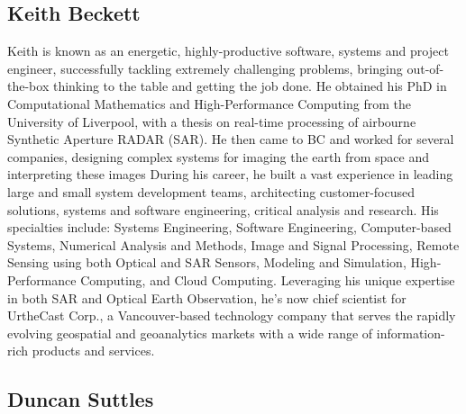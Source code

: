 \subsection*{Keith Beckett}

Keith is known as an energetic, highly-productive software, systems
and project engineer, successfully tackling extremely challenging
problems, bringing out-of-the-box thinking to the table and getting
the job done. He obtained his PhD in Computational Mathematics and
High-Performance Computing from the University of Liverpool, with a
thesis on real-time processing of airbourne Synthetic Aperture
RADAR (SAR). He then came to BC and worked for several companies, designing complex
systems for imaging the earth from space and interpreting these images
During his career, he built a vast experience in leading large and small system
development teams, architecting customer-focused solutions, systems
and software engineering, critical analysis and research. His
specialties include: Systems Engineering, Software Engineering,
Computer-based Systems, Numerical Analysis and Methods, Image and
Signal Processing, Remote Sensing using both Optical and SAR Sensors,
Modeling and Simulation, High-Performance Computing, and Cloud
Computing. Leveraging his unique expertise in both SAR and Optical Earth
Observation, he's now chief scientist for UrtheCast Corp., a Vancouver-based
technology company that serves the rapidly evolving geospatial and
geoanalytics markets with a wide range of information-rich products
and services.

\subsection*{Duncan Suttles}
